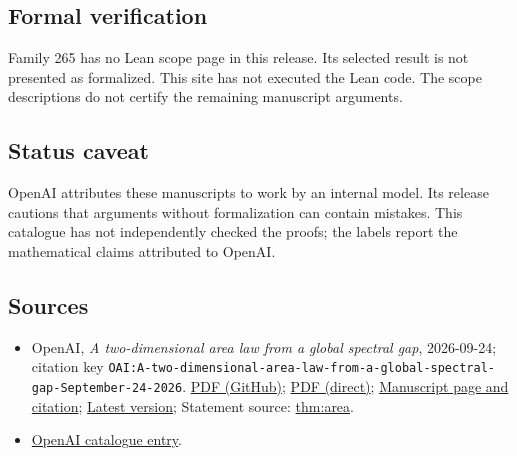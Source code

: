 \documentclass[11pt]{article}
\begin{document}
\subsection{Formal verification}
Family 265 has no Lean scope page in this release. Its selected result is not presented as formalized. This site has not executed the Lean code. The scope descriptions do not certify the remaining manuscript arguments.

\subsection{Status caveat}
OpenAI attributes these manuscripts to work by an internal model. Its release cautions that arguments without formalization can contain mistakes. This catalogue has not independently checked the proofs; the labels report the mathematical claims attributed to OpenAI.

\subsection{Sources}
\begin{itemize}
\item OpenAI, \emph{A two-dimensional area law from a global spectral gap}, 2026-09-24; citation key \texttt{OAI:A-two-dimensional-area-law-from-a-global-spectral-gap-September-24-2026}. \href{https://github.com/openai/math/blob/adc7f1241b42e322a6451854ab7e4b4c146bf78a/preprints/A-two-dimensional-area-law-from-a-global-spectral-gap-September-24-2026/paper.pdf}{PDF (GitHub)}; \href{https://github.com/openai/math/raw/adc7f1241b42e322a6451854ab7e4b4c146bf78a/preprints/A-two-dimensional-area-law-from-a-global-spectral-gap-September-24-2026/paper.pdf}{PDF (direct)}; \href{https://github.com/openai/math/blob/adc7f1241b42e322a6451854ab7e4b4c146bf78a/preprints/A-two-dimensional-area-law-from-a-global-spectral-gap-September-24-2026/README.md}{Manuscript page and citation}; \href{https://github.com/openai/math/blob/main/preprints/A-two-dimensional-area-law-from-a-global-spectral-gap-September-24-2026/paper.pdf}{Latest version}; Statement source: \href{https://github.com/openai/math/blob/adc7f1241b42e322a6451854ab7e4b4c146bf78a/preprints/A-two-dimensional-area-law-from-a-global-spectral-gap-September-24-2026/build/sections/00-introduction.tex\#L39}{thm:area}.
\item \href{https://github.com/openai/math/blob/adc7f1241b42e322a6451854ab7e4b4c146bf78a/CONTENTS.md}{OpenAI catalogue entry}.
\end{itemize}
\end{document}
